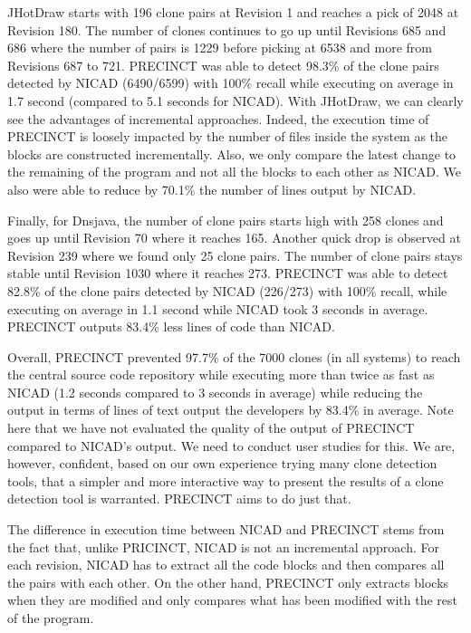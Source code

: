 JHotDraw starts with 196 clone pairs at Revision 1 and reaches a pick of
2048 at Revision 180. The number of clones continues to go up until
Revisions 685 and 686 where the number of pairs is 1229 before picking
at 6538 and more from Revisions 687 to 721. PRECINCT was able to detect
98.3\% of the clone pairs detected by NICAD (6490/6599) with 100\%
recall while executing on average in 1.7 second (compared to 5.1 seconds
for NICAD). With JHotDraw, we can clearly see the advantages of
incremental approaches. Indeed, the execution time of PRECINCT is
loosely impacted by the number of files inside the system as the blocks
are constructed incrementally. Also, we only compare the latest change
to the remaining of the program and not all the blocks to each other as
NICAD. We also were able to reduce by 70.1\% the number of lines output
by NICAD.

Finally, for Dnsjava, the number of clone pairs starts high with 258
clones and goes up until Revision 70 where it reaches 165. Another quick
drop is observed at Revision 239 where we found only 25 clone pairs. The
number of clone pairs stays stable until Revision 1030 where it reaches
273. PRECINCT was able to detect 82.8\% of the clone pairs detected by
NICAD (226/273) with 100\% recall, while executing on average in 1.1
second while NICAD took 3 seconds in average. PRECINCT outputs 83.4\%
less lines of code than NICAD.

Overall, PRECINCT prevented 97.7\% of the 7000 clones (in all systems)
to reach the central source code repository while executing more than
twice as fast as NICAD (1.2 seconds compared to 3 seconds in average)
while reducing the output in terms of lines of text output the
developers by 83.4\% in average. Note here that we have not evaluated
the quality of the output of PRECINCT compared to NICAD's output. We
need to conduct user studies for this. We are, however, confident, based
on our own experience trying many clone detection tools, that a simpler
and more interactive way to present the results of a clone detection
tool is warranted. PRECINCT aims to do just that.

The difference in execution time between NICAD and PRECINCT stems from
the fact that, unlike PRICINCT, NICAD is not an incremental approach.
For each revision, NICAD has to extract all the code blocks and then
compares all the pairs with each other. On the other hand, PRECINCT only
extracts blocks when they are modified and only compares what has been
modified with the rest of the program.

